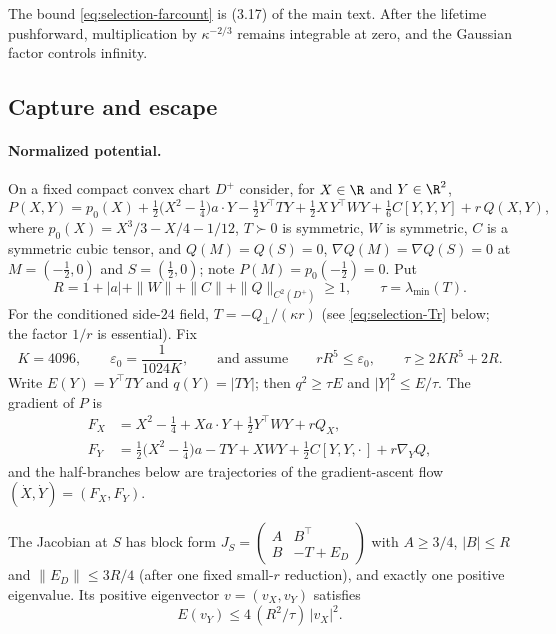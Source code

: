 The bound \eqref{eq:selection-farcount} is (3.17) of the main text. After the lifetime pushforward, multiplication by $\kappa^{-2/3}$ remains integrable at zero, and the Gaussian factor controls infinity.

\subsection{Capture and escape}\label{ssec:selection-escape}

\paragraph{Normalized potential.} On a fixed compact convex chart $D^+$ consider, for $X\in\R$ and $Y\in\R^2$,
\begin{equation}\label{eq:selection-potential}
P(X,Y)=p_0(X)+\tfrac12\bigl(X^2-\tfrac14\bigr)a\cdot Y-\tfrac12Y^{\top}TY+\tfrac12X\,Y^{\top}WY+\tfrac16C[Y,Y,Y]+r\,Q(X,Y),
\end{equation}
where $p_0(X)=X^3/3-X/4-1/12$, $T\succ0$ is symmetric, $W$ is symmetric, $C$ is a symmetric cubic tensor, and $Q(M)=Q(S)=0$, $\nabla Q(M)=\nabla Q(S)=0$ at $M=(-\frac12,0)$ and $S=(\frac12,0)$; note $P(M)=p_0(-\frac12)=0$. Put
\begin{equation}\label{eq:selection-R}
R=1+|a|+\|W\|+\|C\|+\|Q\|_{C^2(D^+)}\ge1,\qquad\tau=\lambda_{\min}(T).
\end{equation}
For the conditioned side-$24$ field, $T=-Q_\perp/(\kappa r)$ (see \eqref{eq:selection-Tr} below; the factor $1/r$ is essential). Fix
\begin{equation}\label{eq:selection-assume}
K=4096,\qquad\varepsilon_0=\frac1{1024K},\qquad\text{and assume}\qquad rR^5\le\varepsilon_0,\qquad\tau\ge2KR^5+2R .
\end{equation}
Write $E(Y)=Y^{\top}TY$ and $q(Y)=|TY|$; then $q^2\ge\tau E$ and $|Y|^2\le E/\tau$. The gradient of $P$ is
\begin{equation}\label{eq:selection-gradient}
\begin{aligned}
F_X&=X^2-\tfrac14+Xa\cdot Y+\tfrac12Y^{\top}WY+rQ_X,\\
F_Y&=\tfrac12\bigl(X^2-\tfrac14\bigr)a-TY+XWY+\tfrac12C[Y,Y,\cdot\,]+r\nabla_YQ,
\end{aligned}
\end{equation}
and the half-branches below are trajectories of the gradient-ascent flow $(\dot X,\dot Y)=(F_X,F_Y)$.

\begin{lemma}\label{lem:selection-slope}
The Jacobian at $S$ has block form $J_S=\begin{pmatrix}A&B^{\top}\\B&-T+E_D\end{pmatrix}$ with $A\ge3/4$, $|B|\le R$ and $\|E_D\|\le3R/4$ (after one fixed small-$r$ reduction), and exactly one positive eigenvalue. Its positive eigenvector $v=(v_X,v_Y)$ satisfies
\begin{equation}\label{eq:selection-slope}
E(v_Y)\le4\,(R^2/\tau)\,|v_X|^2 .
\end{equation}
\end{lemma}

